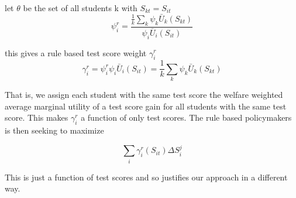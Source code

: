 \documentclass{article}
\theoremstyle{definition}
\theoremstyle{definition}
\theoremstyle{definition}
\begin{document}
\begin{definition}
let $\theta$ be the set of all students k with $S_{kt} = S_{it}$
\begin{equation}
 \psi_i^r = \frac{\frac{1}{k} \sum_k \psi_k\bar{U}_{k}(S_{kt})}{\psi_i\bar{U}_{i}(S_{it})}
\end{equation}

this gives a rule based test score weight $\gamma_i^r$
\begin{equation}
    \gamma_i^r = \psi_i^r \psi_i \bar{U}_{i}(S_{it}) = \frac{1}{k} \sum_k \psi_k\bar{U}_{k}(S_{kt})
\end{equation}
\end{definition}

That is, we assign each student with the same test score the welfare weighted average marginal utility of a test score gain for all students with the same test score. This makes $\gamma_i^r$ a function of only test scores. The rule based policymakers is then seeking to maximize 

\begin{equation}
    \sum_i \gamma_i^r(S_{it})  \Delta S_i^j
\end{equation}
  
  This is just a function of test scores and so justifies our approach in a different way. 




\end{document}
